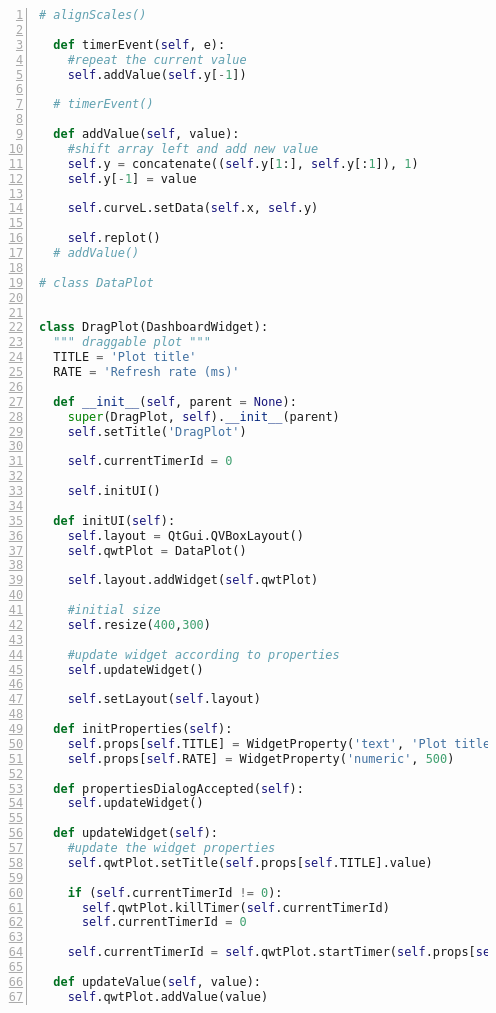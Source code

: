 \begin{lstlisting}[frame=single,caption={DragPlot implementation.},label=drag_plot_implementation,language=Python,numbers=left,breaklines=true]
  # alignScales()
  
  def timerEvent(self, e):
    #repeat the current value
    self.addValue(self.y[-1])

  # timerEvent()

  def addValue(self, value):
    #shift array left and add new value
    self.y = concatenate((self.y[1:], self.y[:1]), 1)
    self.y[-1] = value

    self.curveL.setData(self.x, self.y)

    self.replot()
  # addValue()

# class DataPlot


class DragPlot(DashboardWidget):
  """ draggable plot """
  TITLE = 'Plot title'
  RATE = 'Refresh rate (ms)'
  
  def __init__(self, parent = None):
    super(DragPlot, self).__init__(parent)
    self.setTitle('DragPlot')
    
    self.currentTimerId = 0
    
    self.initUI()
      
  def initUI(self):
    self.layout = QtGui.QVBoxLayout()
    self.qwtPlot = DataPlot()
    
    self.layout.addWidget(self.qwtPlot)
    
    #initial size
    self.resize(400,300)
    
    #update widget according to properties
    self.updateWidget()
    
    self.setLayout(self.layout)
      
  def initProperties(self):
    self.props[self.TITLE] = WidgetProperty('text', 'Plot title')
    self.props[self.RATE] = WidgetProperty('numeric', 500)
  
  def propertiesDialogAccepted(self):
    self.updateWidget()

  def updateWidget(self):
    #update the widget properties
    self.qwtPlot.setTitle(self.props[self.TITLE].value)

    if (self.currentTimerId != 0):
      self.qwtPlot.killTimer(self.currentTimerId)
      self.currentTimerId = 0

    self.currentTimerId = self.qwtPlot.startTimer(self.props[self.RATE].value)
      
  def updateValue(self, value):
    self.qwtPlot.addValue(value)
\end{lstlisting}

\newpage

